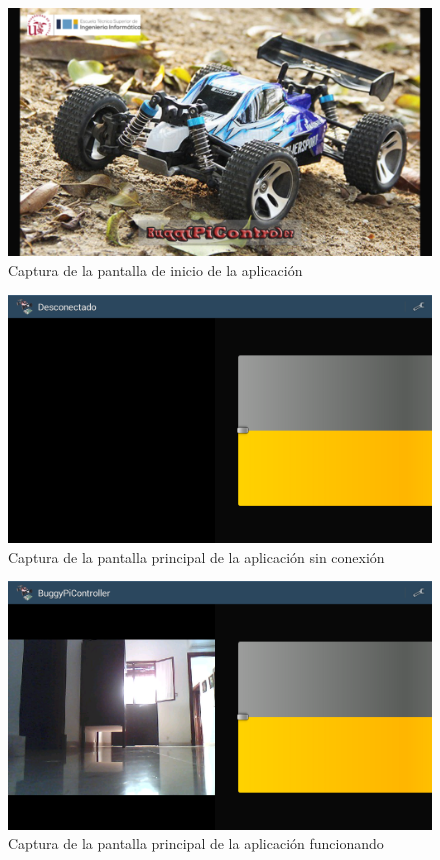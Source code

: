 \documentclass{pclass}
\begin{document}
\begin{itemize}
\begin{itemize}
	\begin{figure}[H]
		\centering
		\includegraphics[width=1\textwidth]{img/inicio}
		\caption{Captura de la pantalla de inicio de la aplicación}
		\label{fig:capturaInicio}
	\end{figure}

	\begin{figure}[H]
		\centering
		\includegraphics[width=1\textwidth]{img/sin_conexion}
		\caption{Captura de la pantalla principal de la aplicación sin conexión}
		\label{fig:capturaSinConexion}
	\end{figure}

	\begin{figure}[H]
		\centering
		\includegraphics[width=1\textwidth]{img/conectado}
		\caption{Captura de la pantalla principal de la aplicación funcionando}
		\label{fig:capturaConConexion}
	\end{figure}
	

\end{itemize}
\end{itemize}
\end{document}
